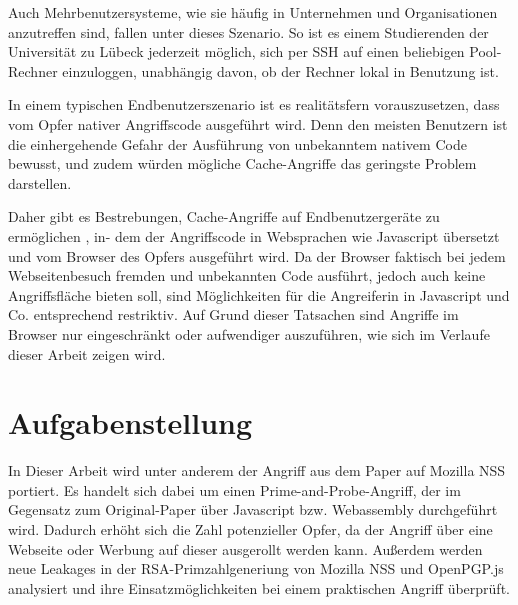 Auch Mehrbenutzersysteme, wie sie häufig in Unternehmen und Organisationen anzutreffen sind, fallen unter dieses Szenario.
So ist es einem Studierenden der Universität zu Lübeck jederzeit möglich, sich per SSH auf einen beliebigen Pool-Rechner einzuloggen, unabhängig davon, ob der Rechner lokal in Benutzung ist.

In einem typischen Endbenutzerszenario ist es realitätsfern vorauszusetzen, dass vom Opfer nativer Angriffscode ausgeführt wird.
Denn den meisten Benutzern ist die einhergehende Gefahr der Ausführung von unbekanntem nativem Code bewusst, und zudem würden mögliche Cache-Angriffe das geringste Problem darstellen.

Daher gibt es Bestrebungen, Cache-Angriffe auf Endbenutzergeräte zu ermöglichen \cite{TheSpyInTheSandbox,DriveByPaper,ASLROnTheLine}, in- dem der Angriffscode in Websprachen wie Javascript übersetzt und vom Browser des Opfers ausgeführt wird.
Da der Browser faktisch bei jedem Webseitenbesuch fremden und unbekannten Code ausführt, jedoch auch keine Angriffsfläche bieten soll, sind Möglichkeiten für die Angreiferin in Javascript und Co. entsprechend restriktiv.
Auf Grund dieser Tatsachen sind Angriffe im Browser nur eingeschränkt oder aufwendiger auszuführen, wie sich im Verlaufe dieser Arbeit zeigen wird. 

\section{Aufgabenstellung}


In Dieser Arbeit wird unter anderem der Angriff aus dem Paper \cite{RSAKeyGeneration2} auf Mozilla NSS portiert. Es handelt sich dabei um einen Prime-and-Probe-Angriff, der im Gegensatz zum Original-Paper über Javascript bzw. Webassembly durchgeführt wird. Dadurch erhöht sich die Zahl potenzieller Opfer, da der Angriff über eine Webseite oder Werbung auf dieser ausgerollt werden kann.
Außerdem werden neue Leakages in der RSA-Primzahlgeneriung von Mozilla NSS und OpenPGP.js analysiert und ihre Einsatzmöglichkeiten bei einem praktischen Angriff überprüft.


